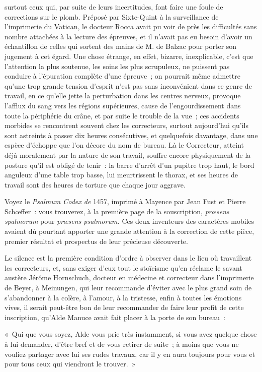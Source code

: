 \documentclass[french,twoside]{book} %
\begin{document}
surtout ceux qui, par suite de leurs incertitudes, font faire une foule de corrections sur le plomb. Préposé par Sixte-Quint à la surveillance de l’imprimerie du Vatican, le docteur Rocca avait pu voir de près les difficultés sans nombre attachées à la lecture des épreuves, et il n’avait pas eu besoin d’avoir un échantillon de celles qui sortent des mains de M. de Balzac pour porter son jugement à cet égard. Une chose étrange, en effet, bizarre, inexplicable, c’est que l’attention la plus soutenue, les soins les plus scrupuleux,  ne puissent pas conduire à l’épuration complète d’une épreuve ; on pourrait même admettre qu’une trop grande tension d’esprit n’est pas sans inconvénient dans ce genre de travail, en ce qu’elle jette la perturbation dans les centres nerveux, provoque l’afflux du sang vers les régions supérieures, cause de l’engourdissement dans toute la périphérie du crâne, et par suite le trouble de la vue ; ces accidents morbides se rencontrent souvent chez les correcteurs, surtout aujourd’hui qu’ils sont astreints à passer dix heures consécutives, et quelquefois davantage, dans une espèce d’échoppe que l’on décore du nom de bureau. Là le Correcteur, atteint déjà moralement par la nature de son travail, souffre encore physiquement de la posture qu’il est obligé de tenir : la barre d’arrêt d’un pupitre trop haut, le bord anguleux d’une table trop basse, lui meurtrissent le thorax, et ses heures de travail sont des  heures de torture que chaque jour aggrave.\par
Voyez le \emph{Psalmum Codex de} 1457, imprimé à Mayence par Jean Fust et Pierre Schœffer : vous trouverez, à la première page de la souscription, \emph{prœsens spalmorum } pour \emph{prœsens psalmorum.} Ces deux inventeurs des caractères mobiles avaient dû pourtant apporter une grande attention à la correction de cette pièce, premier résultat et prospectus de leur précieuse découverte.\par
Le silence est la première condition d’ordre à observer dans le lieu où travaillent les correcteurs, et, sans exiger d’eux tout le stoïcisme qu’en réclame le savant austère Jérôme Hornschuch, docteur en médecine et correcteur dans l’imprimerie de Beyer, à Meinungen, qui leur recommande d’éviter avec le plus grand soin de s’abandonner à la colère, à l’amour, à la tristesse, enfin à toutes les émotions vives, il serait peut-être bon de leur recommander de faire leur profit  de cette inscription, qu’Alde Manuce avait fait placer à la porte de son bureau :\par
« Qui que vous soyez, Alde vous prie très instamment, si vous avez quelque chose à lui demander, d’être bref et de vous retirer de suite ; à moins que vous ne vouliez partager avec lui ses rudes travaux, car il y en aura toujours pour vous et pour tous ceux qui viendront le trouver. »\par
\end{document}

